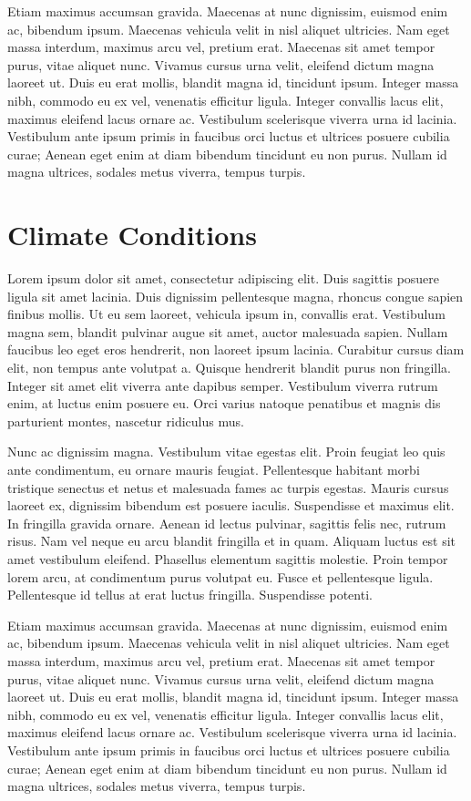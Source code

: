 \documentclass[
  letterpaper,
  DIV=11,
  numbers=noendperiod]{scrreprt}
\begin{document}
Etiam maximus accumsan gravida. Maecenas at nunc dignissim, euismod enim
ac, bibendum ipsum. Maecenas vehicula velit in nisl aliquet ultricies.
Nam eget massa interdum, maximus arcu vel, pretium erat. Maecenas sit
amet tempor purus, vitae aliquet nunc. Vivamus cursus urna velit,
eleifend dictum magna laoreet ut. Duis eu erat mollis, blandit magna id,
tincidunt ipsum. Integer massa nibh, commodo eu ex vel, venenatis
efficitur ligula. Integer convallis lacus elit, maximus eleifend lacus
ornare ac. Vestibulum scelerisque viverra urna id lacinia. Vestibulum
ante ipsum primis in faucibus orci luctus et ultrices posuere cubilia
curae; Aenean eget enim at diam bibendum tincidunt eu non purus. Nullam
id magna ultrices, sodales metus viverra, tempus turpis.

\chapter{Climate Conditions}\label{climate-conditions}

Lorem ipsum dolor sit amet, consectetur adipiscing elit. Duis sagittis
posuere ligula sit amet lacinia. Duis dignissim pellentesque magna,
rhoncus congue sapien finibus mollis. Ut eu sem laoreet, vehicula ipsum
in, convallis erat. Vestibulum magna sem, blandit pulvinar augue sit
amet, auctor malesuada sapien. Nullam faucibus leo eget eros hendrerit,
non laoreet ipsum lacinia. Curabitur cursus diam elit, non tempus ante
volutpat a. Quisque hendrerit blandit purus non fringilla. Integer sit
amet elit viverra ante dapibus semper. Vestibulum viverra rutrum enim,
at luctus enim posuere eu. Orci varius natoque penatibus et magnis dis
parturient montes, nascetur ridiculus mus.

Nunc ac dignissim magna. Vestibulum vitae egestas elit. Proin feugiat
leo quis ante condimentum, eu ornare mauris feugiat. Pellentesque
habitant morbi tristique senectus et netus et malesuada fames ac turpis
egestas. Mauris cursus laoreet ex, dignissim bibendum est posuere
iaculis. Suspendisse et maximus elit. In fringilla gravida ornare.
Aenean id lectus pulvinar, sagittis felis nec, rutrum risus. Nam vel
neque eu arcu blandit fringilla et in quam. Aliquam luctus est sit amet
vestibulum eleifend. Phasellus elementum sagittis molestie. Proin tempor
lorem arcu, at condimentum purus volutpat eu. Fusce et pellentesque
ligula. Pellentesque id tellus at erat luctus fringilla. Suspendisse
potenti.

Etiam maximus accumsan gravida. Maecenas at nunc dignissim, euismod enim
ac, bibendum ipsum. Maecenas vehicula velit in nisl aliquet ultricies.
Nam eget massa interdum, maximus arcu vel, pretium erat. Maecenas sit
amet tempor purus, vitae aliquet nunc. Vivamus cursus urna velit,
eleifend dictum magna laoreet ut. Duis eu erat mollis, blandit magna id,
tincidunt ipsum. Integer massa nibh, commodo eu ex vel, venenatis
efficitur ligula. Integer convallis lacus elit, maximus eleifend lacus
ornare ac. Vestibulum scelerisque viverra urna id lacinia. Vestibulum
ante ipsum primis in faucibus orci luctus et ultrices posuere cubilia
curae; Aenean eget enim at diam bibendum tincidunt eu non purus. Nullam
id magna ultrices, sodales metus viverra, tempus turpis.
\end{document}
